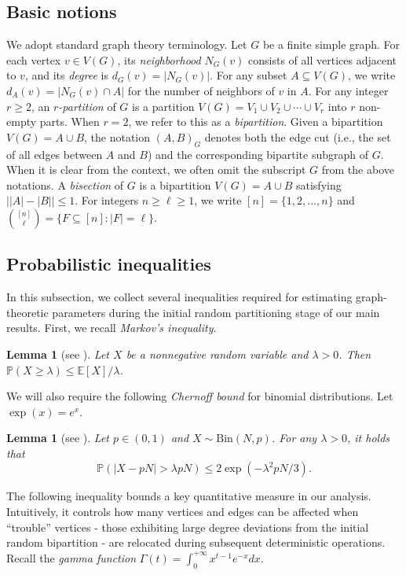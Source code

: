 \documentclass{aic}
\newtheorem{lemma}[dfn]{Lemma}
\def\Bin{\mathrm{Bin}}
\newcommand{\E}{{\mathbb{E}}}
\newcommand{\Prob}{{\mathbb{P}}}
\begin{document}
	\subsection{Basic notions}
	\noindent
	We adopt standard graph theory terminology. Let $G$ be a finite simple graph.
	For each vertex $v \in V(G)$, its \emph{neighborhood} $N_G(v)$ consists of all vertices adjacent to $v$,
	and its \emph{degree} is $d_G(v) = |N_G(v)|$. For any subset $A \subseteq V(G)$,
	we write $d_A(v) = |N_G(v) \cap A|$ for the number of neighbors of $v$ in $A$.
	For any integer $r \geq 2$, an {\it $r$-partition} of $G$ is a partition $V(G) = V_1 \cup V_2 \cup \cdots \cup V_r$ into $r$ non-empty parts.
	When $r=2$, we refer to this as a {\it bipartition}.
	Given a bipartition $V(G) = A \cup B$, the notation $(A,B)_G$ denotes both the edge cut
	(i.e., the set of all edges between $A$ and $B$) and the corresponding bipartite subgraph of $G$.
	When it is clear from the context, we often omit the subscript $G$ from the above notations.
	A {\it bisection} of $G$ is a bipartition $V(G) = A \cup B$ satisfying $\big| |A|-|B|\big|\leq 1$.
	For integers $n\geq \ell\geq 1$, we write $[n]=\{1,2,...,n\}$ and $\binom{[n]}{\ell}=\{F\subseteq [n]: |F|=\ell\}$.
	
	
	
	\subsection{Probabilistic inequalities}
	\noindent
	In this subsection, we collect several inequalities required for estimating graph-theoretic parameters during the initial random partitioning stage of our main results.
	First, we recall {\it Markov's inequality}.
	
	\begin{lemma}[see \cite{AS}]\label{Lem:Markov}
		Let $X$ be a nonnegative random variable and $\lambda > 0$. Then $\Prob(X\ge \lambda)\leq \E[X]/\lambda$.
	\end{lemma}
	
	We will also require the following {\it Chernoff bound} for binomial distributions. Let $\exp(x)=e^x$.
	
	\begin{lemma}[see \cite{AS}]\label{Lem:Chernoff}
		Let $p\in (0,1)$ and $X\sim \Bin(N,p)$. For any $\lambda > 0$, it holds that
		$$\Prob(|X-pN|>\lambda pN) \leq 2 \exp(-\lambda^2pN/3).$$
	\end{lemma}
	
	
	The following inequality bounds a key quantitative measure in our analysis.
	Intuitively, it controls how many vertices and edges can be affected when ``trouble'' vertices - those exhibiting large degree deviations from the initial random bipartition - are relocated during subsequent deterministic operations.
	Recall the {\it gamma function} $\Gamma(t)=\int_{0}^{+\infty} x^{t-1} e^{-x} dx$.
	
\end{document}

